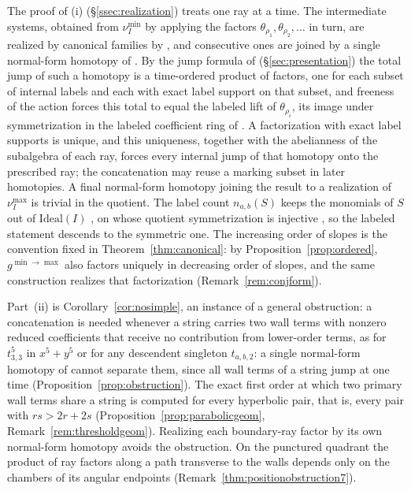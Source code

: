 \documentclass[11pt]{amsart}
\theoremstyle{definition}
\theoremstyle{remark}
\begin{document}
The proof of (i) (\S\ref{ssec:realization}) treats one ray at a time.  The
intermediate systems, obtained from $\nu_I^{\min}$ by applying the factors
$\theta_{\rho_1},\theta_{\rho_2},\dots$ in turn, are realized by canonical
families by \cite[Cor.~5.14]{GKT}, and consecutive ones are joined by a single
normal-form homotopy of \cite[Lem.~3.40]{GKT}.  By the jump formula of
\cite[proof of Thm.~5.9]{GKT} (\S\ref{sec:presentation}) the
total jump of such a homotopy is a time-ordered product of factors, one for
each subset of internal labels and each with exact label support on that
subset, and freeness of the action forces this total to equal the labeled
lift of $\theta_{\rho_i}$, its image under symmetrization in the labeled
coefficient ring of \cite[Def.~4.6]{GKT}.  A factorization with exact label supports is
unique, and this uniqueness, together with the abelianness of the subalgebra
of each ray, forces every internal jump of that homotopy onto the prescribed
ray; the concatenation may reuse a marking subset in later homotopies.  A final
normal-form homotopy joining the result to a realization of $\nu_I^{\max}$ is
trivial in the quotient.  The label count $n_{a,b}(S)$ keeps the monomials
of $S$ out of $\mathrm{Ideal}(I)$ \cite[Def.~4.10]{GKT}, on whose quotient
symmetrization is injective \cite[Lem.~4.14]{GKT}, so the labeled statement
descends to the symmetric one.  The increasing order of slopes is the convention fixed in
Theorem~\ref{thm:canonical}: by Proposition~\ref{prop:ordered},
$g^{\min\to\max}$ also factors uniquely in decreasing order of slopes, and the
same construction realizes that factorization (Remark~\ref{rem:conjform}).

Part~(ii) is Corollary~\ref{cor:nosimple}, an instance of a general
obstruction: a concatenation is needed whenever a string carries two wall terms with
nonzero reduced coefficients that receive no contribution from lower-order
terms, as for
$t_{3,3}^5$ in $x^5+y^5$ or for any descendent singleton $t_{a,b,2}$: a single
normal-form homotopy of \cite[Lem.~3.40]{GKT} cannot separate them, since all
wall terms of a string jump at one time (Proposition~\ref{prop:obstruction}).
The exact first order at which two primary wall terms share a string is
computed for every hyperbolic pair, that is, every pair with $rs>2r+2s$
(Proposition~\ref{prop:parabolicgeom},
Remark~\ref{rem:thresholdgeom}).  Realizing each boundary-ray factor by its
own normal-form homotopy avoids the obstruction.  On the punctured quadrant the
product of ray factors along a path transverse to the walls depends only on
the chambers of its angular endpoints
(Remark~\ref{thm:positionobstruction7}).
\end{document}
